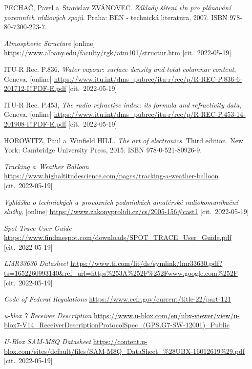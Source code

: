 \documentclass[twoside]{ctuthesis}
\theoremstyle{plain}
\theoremstyle{definition}
\theoremstyle{note}
\begin{document}
\appendix
\begin{thebibliography}{1}
	PECHAČ, Pavel a~Stanislav ZVÁNOVEC. \textit{Základy šíření vln pro plánování pozemních rádiových spojů}. Praha: BEN - technická literatura, 2007. ISBN 978-80-7300-223-7.

	\textit{Atmospheric Structure} [online] \url{https://www.albany.edu/faculty/rgk/atm101/structur.htm} [cit.~2022-05-19]

	ITU-R Rec. P.836, \textit{Water vapour: surface density and total columnar content}, Geneva, [online] \url{https://www.itu.int/dms_pubrec/itu-r/rec/p/R-REC-P.836-6-201712-I!!PDF-E.pdf} [cit.~2022-05-19]

	ITU-R Rec. P.453, \textit{The radio refractive index: its formula and refractivity data}, Geneva, [online] \url{https://www.itu.int/dms_pubrec/itu-r/rec/p/R-REC-P.453-14-201908-I!!PDF-E.pdf} [cit.~2022-05-19]

	HOROWITZ, Paul a~Winfield HILL. \textit{The art of electronics}. Third edition. New York: Cambridge University Press, 2015. ISBN 978-0-521-80926-9.

	\textit{Tracking a~Weather Balloon}
    \url{https://www.highaltitudescience.com/pages/tracking-a-weather-balloon} [cit.~2022-05-19]

	\textit{Vyhláška o technických a~provozních podmínkách amatérské radiokomunikační služby}, [online] \url{https://www.zakonyprolidi.cz/cs/2005-156#cast1} [cit.~2022-05-19]

	\textit{Spot Trace User Guide}
    \url{https://www.findmespot.com/downloads/SPOT_TRACE_User_Guide.pdf} [cit.~2022-05-19]

	\textit{LMR33630 Datasheet}
	\url{https://www.ti.com/lit/ds/symlink/lmr33630.pdf?ts=1652260993140&ref_url=https%253A%252F%252Fwww.google.com%252F} [cit.~2022-05-19]

	\textit{Code of Federal Regulations}
	\url{https://www.ecfr.gov/current/title-22/part-121}

	\textit{u-blox 7 Receiver Description}
	\url{https://www.u-blox.com/en/ubx-viewer/view/u-blox7-V14_ReceiverDescriptionProtocolSpec_(GPS.G7-SW-12001)_Public}

	\textit{U-Blox SAM-M8Q Datasheet}
	\url{https://content.u-blox.com/sites/default/files/SAM-M8Q_DataSheet_%28UBX-16012619%29.pdf} [cit.~2022-05-19]


\end{thebibliography}
\end{document}

